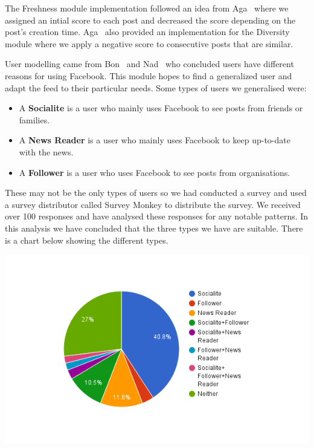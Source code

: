 The Freshness module implementation followed an idea from Aga~\cite{Aga2014} where we assigned an intial score to each post and decreased the score depending on the post's creation time. Aga~\cite{Aga2014} also provided an implementation for the Diversity module where we apply a negative score to consecutive posts that are similar. 

User modelling came from Bon~\cite{bonds2010myspace} and Nad~\cite{nadkarni2012people} who concluded users have different reasons for using Facebook. This module hopes to find a generalized user and adapt the feed to their particular needs. Some types of users we generalised were:

\begin{itemize}
	\item A \textbf{Socialite} is a user who mainly uses Facebook to see posts from friends or families.
 	\item A \textbf{News Reader} is a user who mainly uses Facebook to keep up-to-date with the news.
  	\item A \textbf{Follower} is a user who uses Facebook to see posts from organisations.
\end{itemize}

These may not be the only types of users so we had conducted a survey and used a survey distributor called Survey Monkey to distribute the survey. We received over 100 responses and have analysed these responses for any notable patterns. In this analysis we have concluded that the three types we have are suitable. There is a chart below showing the different types.

\begin{center}
  \includegraphics[scale=0.8]{images/usermodelChart.png}
\end{center}

